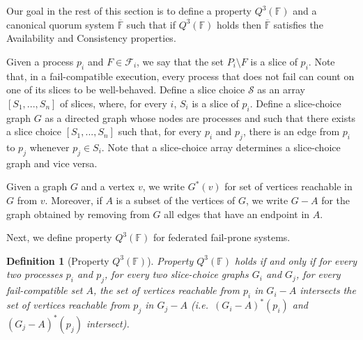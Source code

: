 \documentclass[11pt,letterpaper]{article}
\newtheorem{definition}{Definition}
\begin{document}
Our goal in the rest of this section is to define a property $Q^3(\mathbb{F})$ and a canonical quorum system $\overline{\mathbb{F}}$ such that if $Q^3(\mathbb{F})$ holds then $\overline{\mathbb{F}}$ satisfies the Availability and Consistency properties.



Given a process $p_i$ and $F\in \mathcal{F}_i$, we say that the set $P_i\setminus F$ is a slice of $p_i$.
Note that, in a fail-compatible execution, every process that does not fail can count on one of its slices to be well-behaved.
Define a slice choice $\mathcal{S}$ as an array $\left[S_1,...,S_n\right]$ of slices, where, for every $i$, $S_i$ is a slice of $p_i$.
Define a slice-choice graph $G$ as a directed graph whose nodes are processes and such that there exists a slice choice $\left[S_1,...,S_n\right]$ such that, for every $p_i$ and $p_j$, there is an edge from $p_i$ to $p_j$ whenever $p_j\in S_i$. Note that a slice-choice array determines a slice-choice graph and vice versa.

Given a graph $G$ and a vertex $v$, we write $G^*(v)$ for set of vertices reachable in $G$ from $v$. Moreover, if $A$ is a subset of the vertices of $G$, we write $G-A$ for the graph obtained by removing from $G$ all edges that have an endpoint in $A$.



Next, we define property $Q^3(\mathbb{F})$ for federated fail-prone systems.
\begin{definition}[Property $Q^3(\mathbb{F})$]
  Property $Q^3(\mathbb{F})$ holds if and only if for every two processes $p_i$ and $p_j$, for every two slice-choice graphs $G_i$ and $G_j$, for every fail-compatible set $A$, the set of vertices reachable from $p_i$ in $G_i-A$ intersects the set of vertices reachable from $p_j$ in $G_j-A$ (i.e.\ $\left(G_i-A\right)^*(p_i)$ and $\left(G_j-A\right)^*(p_j)$ intersect).
\end{definition}
\end{document}
